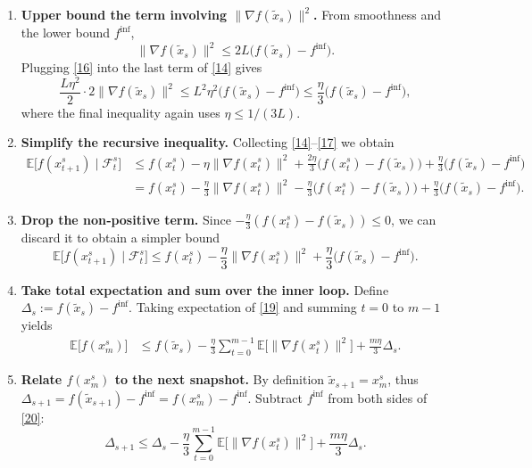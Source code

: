 \documentclass[11pt]{article}
\newcommand{\E}{\mathbb{E}}
\begin{document}
\begin{enumerate}[label=[Step \arabic*]]
\item \textbf{Upper bound the term involving $\|\nabla f(\tilde{x}_s)\|^{2}$.}  
From smoothness and the lower bound $f^{\inf}$,
\[
\|\nabla f(\tilde{x}_s)\|^{2}
\le 2L\bigl(f(\tilde{x}_s)-f^{\inf}\bigr).
\tag{16}
\]
Plugging \eqref{16} into the last term of \eqref{14} gives
\[
\frac{L\eta^{2}}{2}\cdot2\|\nabla f(\tilde{x}_s)\|^{2}
\le L^{2}\eta^{2}\bigl(f(\tilde{x}_s)-f^{\inf}\bigr)
\le \frac{\eta}{3}\bigl(f(\tilde{x}_s)-f^{\inf}\bigr),
\tag{17}
\]
where the final inequality again uses $\eta\le 1/(3L)$.

\item \textbf{Simplify the recursive inequality.}  
Collecting \eqref{14}–\eqref{17} we obtain
\[
\begin{aligned}
\E\!\bigl[f(x^{s}_{t+1})\mid\mathcal{F}^{s}_t\bigr]
&\le f(x^{s}_t)-\eta\|\nabla f(x^{s}_t)\|^{2}
+\frac{2\eta}{3}\bigl(f(x^{s}_t)-f(\tilde{x}_s)\bigr)
+\frac{\eta}{3}\bigl(f(\tilde{x}_s)-f^{\inf}\bigr)\\
&= f(x^{s}_t)-\frac{\eta}{3}\|\nabla f(x^{s}_t)\|^{2}
-\frac{\eta}{3}\bigl(f(x^{s}_t)-f(\tilde{x}_s)\bigr)
+\frac{\eta}{3}\bigl(f(\tilde{x}_s)-f^{\inf}\bigr).
\end{aligned}
\tag{18}
\]

\item \textbf{Drop the non‑positive term.}  
Since $-\frac{\eta}{3}(f(x^{s}_t)-f(\tilde{x}_s))\le0$, we can discard it to obtain a simpler bound
\[
\E\!\bigl[f(x^{s}_{t+1})\mid\mathcal{F}^{s}_t\bigr]
\le f(x^{s}_t)-\frac{\eta}{3}\|\nabla f(x^{s}_t)\|^{2}
+\frac{\eta}{3}\bigl(f(\tilde{x}_s)-f^{\inf}\bigr).
\tag{19}
\]

\item \textbf{Take total expectation and sum over the inner loop.}  
Define $\Delta_s:=f(\tilde{x}_s)-f^{\inf}$.  Taking expectation of \eqref{19} and summing $t=0$ to $m-1$ yields
\[
\begin{aligned}
\E\!\bigl[f(x^{s}_{m})\bigr]
&\le f(\tilde{x}_s)-\frac{\eta}{3}\sum_{t=0}^{m-1}\E\!\bigl[\|\nabla f(x^{s}_t)\|^{2}\bigr]
+\frac{m\eta}{3}\Delta_s .
\end{aligned}
\tag{20}
\]

\item \textbf{Relate $f(x^{s}_{m})$ to the next snapshot.}  
By definition $\tilde{x}_{s+1}=x^{s}_{m}$, thus $\Delta_{s+1}=f(\tilde{x}_{s+1})-f^{\inf}=f(x^{s}_{m})-f^{\inf}$.  
Subtract $f^{\inf}$ from both sides of \eqref{20}:
\[
\Delta_{s+1}
\le \Delta_s-\frac{\eta}{3}\sum_{t=0}^{m-1}\E\!\bigl[\|\nabla f(x^{s}_t)\|^{2}\bigr]
+\frac{m\eta}{3}\Delta_s .
\tag{21}
\]


\end{enumerate}
\end{document}
